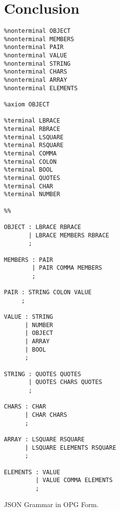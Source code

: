 \chapter{Conclusion} \label{conclusion}

\begin{listing}
\begin{verbatim}
%nonterminal OBJECT
%nonterminal MEMBERS
%nonterminal PAIR
%nonterminal VALUE
%nonterminal STRING
%nonterminal CHARS
%nonterminal ARRAY
%nonterminal ELEMENTS

%axiom OBJECT

%terminal LBRACE
%terminal RBRACE
%terminal LSQUARE
%terminal RSQUARE
%terminal COMMA
%terminal COLON
%terminal BOOL
%terminal QUOTES
%terminal CHAR
%terminal NUMBER

%%

OBJECT : LBRACE RBRACE
       | LBRACE MEMBERS RBRACE
       ;

MEMBERS : PAIR
        | PAIR COMMA MEMBERS
        ;

PAIR : STRING COLON VALUE
     ;

VALUE : STRING
      | NUMBER
      | OBJECT
      | ARRAY
      | BOOL
      ;

STRING : QUOTES QUOTES
       | QUOTES CHARS QUOTES
       ;

CHARS : CHAR
      | CHAR CHARS
      ;

ARRAY : LSQUARE RSQUARE
      | LSQUARE ELEMENTS RSQUARE
      ;

ELEMENTS : VALUE
         | VALUE COMMA ELEMENTS
         ;
\end{verbatim}
\caption{JSON Grammar in OPG Form.}
\label{lst:json_grammar}
\end{listing}
